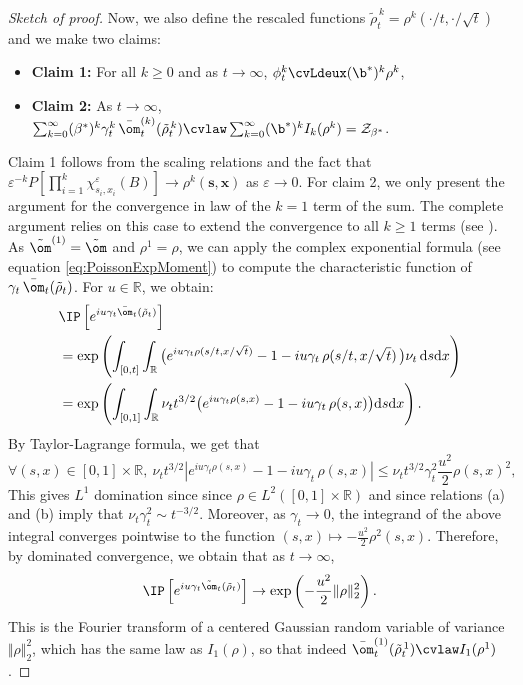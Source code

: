 \begin{proof}[Sketch of proof]
Now, we also define the rescaled functions $\tilde{\rho}^{\,k}_t = \rho^{k}(\cdot/t,\cdot/\sqrt{t})$ and we make two claims:
\begin{itemize}
\item \textbf{Claim 1:} For all $k\geq 0$ and as $t\to\infty$, $\phi^k_t \cvLdeux (\b^*)^k\rho^k$, 
\item \textbf{Claim 2:} As $t\to\infty$, $\sum_{k=0}^\infty (\beta^*)^k \gamma_t^k\,\bar{\om}_t^{(k)}(\tilde{\rho}^{\,k}_t) \cvlaw \sum_{k=0}^\infty (\b^*)^k I_k( \rho^k) = \mathcal{Z}_{\beta^*}$.
\end{itemize}
Claim 1 follows from the scaling relations and the fact that $\varepsilon^{-k} P[\prod_{i=1}^k \chi_{s_i,x_i}^\varepsilon(B)] \to \rho^k(\mathbf{s},\mathbf{x})$ as $\varepsilon\to 0$. For claim 2, we only present the argument for the convergence in law of the $k=1$ term of the sum. The complete argument relies on this case to extend the convergence to all $k\geq 1$ terms (see \cite{CoscoIntermediate}).
As $\tilde{\om}^{(1)}=\tilde{\om}$ and $\rho^1 = \rho$, we can apply the complex exponential formula (see equation \eqref{eq:PoissonExpMoment}) to compute the characteristic function of $\gamma_t \,\bar{\om}_t(\tilde{\rho}_t)$. For $u\in \mathbb{R}$, we obtain:
\begin{align*}&\IP\left[e^{iu\gamma_t\bar{\om}_t(\tilde{\rho}_t)}\right]\\
&=\exp\left(\int_{[0,t]} \int_\mathbb{R}  \big(e^{iu\gamma_t \rho(s/t,x/\sqrt{t})}-1 -iu\gamma_t \, \rho(s/t,x/\sqrt{t})\, \big) \nu_t \, \mathrm{d}s \mathrm{d}x \right)\\
&=\exp\left(\int_{[0,1]} \int_\mathbb{R} \nu_t t^{3/2} \big(e^{iu\gamma_t \rho(s,x)}-1 -iu\gamma_t \, \rho(s,x)\big)\mathrm{d}s \mathrm{d}x \right).
\end{align*}
By Taylor-Lagrange formula, we get that
\begin{equation*}
\forall (s,x)\in [0,1]\times\mathbb{R}, \  \nu_t t^{3/2}\left|e^{iu\gamma_t \rho(s,x)}-1 -iu\gamma_t \, \rho(s,x)\right|\leq \nu_t t^{3/2} \gamma_t^2 \frac{u^2}{2} \rho(s,x)^2,
\end{equation*}
This gives $L^1$ domination since since $\rho\in L^2([0,1]\times\mathbb{R})$ and since relations (a) and (b) imply that $ \nu_t \gamma_t^2 \sim t^{-3/2}$. Moreover, as $\gamma_t \to 0$, the integrand of the above integral converges pointwise to the function $(s,x) \mapsto -\frac{u^2}{2}\rho^2(s,x)$. Therefore, by dominated convergence, we obtain that as $t\to\infty$,
\[\IP\left[e^{iu\gamma_t\tilde{\om}_t(\tilde{\rho}_t)}\right] \to \exp\left(-\frac{u^2}{2} \Vert \rho\Vert^2_2\right).\] This is the Fourier transform of a centered Gaussian random variable of variance $\Vert \rho\Vert^2_2$, which has the same law as $I_1(\rho)$, so that indeed $\bar{\om}_t^{(1)}(\tilde{\rho}^{\,1}_t) \cvlaw I_1(\rho^1)$. 




\end{proof}

